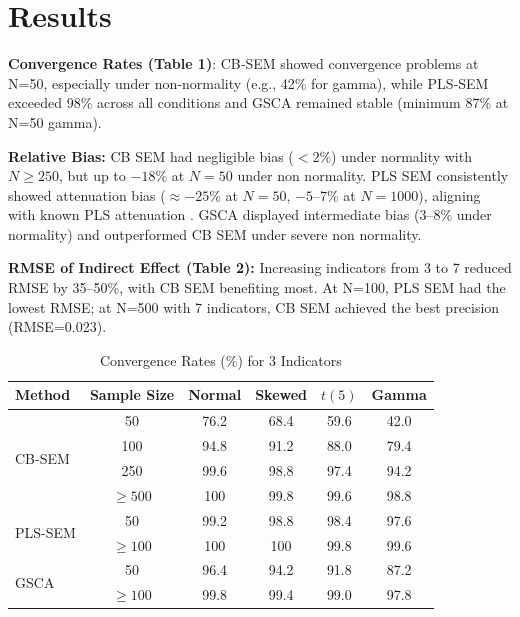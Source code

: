 \documentclass[twoside]{article}
\begin{document}
\section{Results}
\textbf{Convergence Rates (Table 1)}: CB‑SEM showed convergence problems at N=50, especially under non‑normality (e.g., 42\% for gamma), while PLS‑SEM exceeded 98\% across all conditions and GSCA remained stable (minimum 87\% at N=50 gamma).

\textbf{Relative Bias:} CB SEM had negligible bias (\(<2\%\)) under normality with \(N \geq 250\), but up to \(-18\%\) at \(N=50\) under non normality. PLS SEM consistently showed attenuation bias (\(\approx -25\%\) at \(N=50\), \(-5\)--\(7\%\) at \(N=1000\)), aligning with known PLS attenuation \cite{DIJKSTRA:2015}. GSCA displayed intermediate bias (\(3\)--\(8\%\) under normality) and outperformed CB SEM under severe non normality.

\textbf{RMSE of Indirect Effect (Table 2):} Increasing indicators from 3 to 7 reduced RMSE by 35–50\%, with CB SEM benefiting most. At N=100, PLS SEM had the lowest RMSE; at N=500 with 7 indicators, CB SEM achieved the best precision (RMSE=0.023).
\begin{table}[H]
	\centering
	\caption{Convergence Rates (\%) for 3 Indicators}
	\label{tab:convergence}
	\begin{tabular}{lccccc}  %
		\toprule
		\textbf{Method} & \textbf{Sample Size} & \textbf{Normal} & \textbf{Skewed} & \textbf{$t(5)$} & \textbf{Gamma} \\
		\midrule
		\multirow{4}{*}{CB-SEM}   %
		& 50   & 76.2 & 68.4 & 59.6 & 42.0 \\
		& 100  & 94.8 & 91.2 & 88.0 & 79.4 \\
		& 250  & 99.6 & 98.8 & 97.4 & 94.2 \\
		& $\geq 500$ & 100  & 99.8 & 99.6 & 98.8 \\
		\midrule
		\multirow{2}{*}{PLS-SEM}  %
		& 50   & 99.2 & 98.8 & 98.4 & 97.6 \\
		& $\geq 100$ & 100  & 100  & 99.8 & 99.6 \\
		\midrule
		\multirow{2}{*}{GSCA}     %
		& 50   & 96.4 & 94.2 & 91.8 & 87.2 \\
		& $\geq 100$ & 99.8 & 99.4 & 99.0 & 97.8 \\
		\bottomrule
	\end{tabular}
\end{table}
\end{document}
